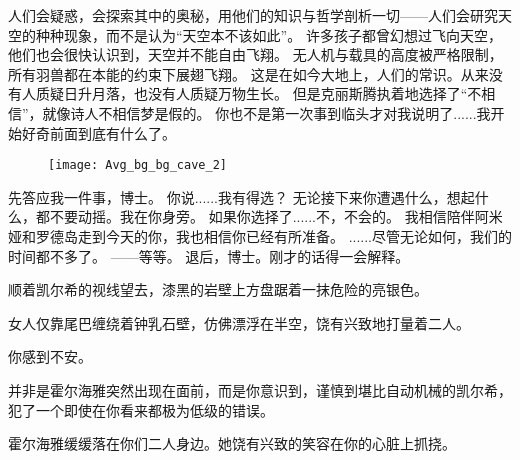 \documentclass[openany]{book}
\begin{document}
\begin{dialogue}
     人们会疑惑，会探索其中的奥秘，用他们的知识与哲学剖析一切——人们会研究天空的种种现象，而不是认为“天空本不该如此”。
     许多孩子都曾幻想过飞向天空，他们也会很快认识到，天空并不能自由飞翔。
     无人机与载具的高度被严格限制，所有羽兽都在本能的约束下展翅飞翔。
     这是在如今大地上，人们的常识。从来没有人质疑日升月落，也没有人质疑万物生长。
     但是克丽斯腾执着地选择了“不相信”，就像诗人不相信梦是假的。
     你也不是第一次事到临头才对我说明了......我开始好奇前面到底有什么了。
    \begin{figure}[h]
        \centering
        \texttt{[image: Avg\_bg\_bg\_cave\_2]}
    \end{figure}
     先答应我一件事，博士。
     你说......我有得选？
     无论接下来你遭遇什么，想起什么，都不要动摇。我在你身旁。
     如果你选择了......不，不会的。
     我相信陪伴阿米娅和罗德岛走到今天的你，我也相信你已经有所准备。
     ......尽管无论如何，我们的时间都不多了。
     ——等等。
     退后，博士。刚才的话得一会解释。
\end{dialogue}\par

顺着凯尔希的视线望去，漆黑的岩壁上方盘踞着一抹危险的亮银色。\par
女人仅靠尾巴缠绕着钟乳石壁，仿佛漂浮在半空，饶有兴致地打量着二人。\par
你感到不安。\par
并非是霍尔海雅突然出现在面前，而是你意识到，谨慎到堪比自动机械的凯尔希，犯了一个即使在你看来都极为低级的错误。\par
霍尔海雅缓缓落在你们二人身边。她饶有兴致的笑容在你的心脏上抓挠。
\end{document}
